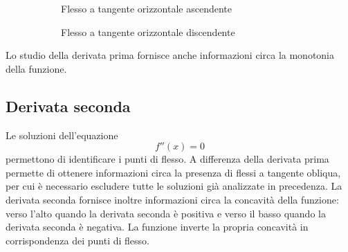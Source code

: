 \documentclass{article}     %
\begin{document}
\begin{figure}[h!]
\begin{subfigure}{0.48\textwidth}
            \caption{Flesso a tangente orizzontale ascendente}
        \end{subfigure}
        \begin{subfigure}{0.48\textwidth}
            \centering
            \caption{Flesso a tangente orizzontale discendente}
        \end{subfigure}
        \caption{}
    \end{figure}
    Lo studio della derivata prima fornisce anche informazioni circa la monotonia della funzione.
    \subsection{Derivata seconda}
    Le soluzioni dell'equazione \[f''(x)=0\] permettono di identificare i punti di flesso. A differenza della derivata prima permette di ottenere informazioni circa la presenza di flessi a tangente obliqua, per cui è necessario escludere tutte le soluzioni già analizzate in precedenza. 
    La derivata seconda fornisce inoltre informazioni circa la concavità della funzione: verso l'alto quando la derivata seconda è positiva e verso il basso quando la derivata seconda è negativa. La funzione inverte la propria concavità in corrispondenza dei punti di flesso.
\end{document}
